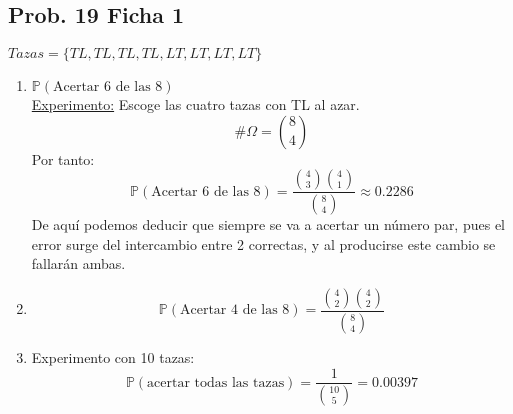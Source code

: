 \documentclass[11pt]{article}
\newcommand{\prob}{\mathbb{P}}
\newcommand{\OMG}{\varOmega}
\theoremstyle{plain}
\begin{document}
        \subsection{Prob. 19 Ficha 1} %
        \label{sub:prob_19_ficha_1}
            $Tazas = \{TL,TL,TL,TL,LT,LT,LT,LT\}$
            \begin{enumerate}
                \item $\prob(\text{Acertar 6 de las 8})$\\
                \underline{Experimento:} Escoge las cuatro tazas con TL al azar. \[\#\OMG = \binom{8}{4}\]
                Por tanto:
                \[\prob(\text{Acertar 6 de las 8}) = \frac{\binom{4}{3}\binom{4}{1}}{\binom{8}{4}} \approx 0.2286\]
                De aquí podemos deducir que siempre se va a acertar un número par, pues el error surge del intercambio entre 2 correctas, y al producirse este cambio se fallarán ambas.
                \item \[\prob(\text{Acertar 4 de las 8}) = \frac{\binom{4}{2}\binom{4}{2}}{\binom{8}{4}} \]
                \item Experimento con 10 tazas:
                \[\prob(\text{acertar todas las tazas}) = \frac{1}{\binom{10}{5}} = 0.00397\]
             \end{enumerate} 
\end{document}
